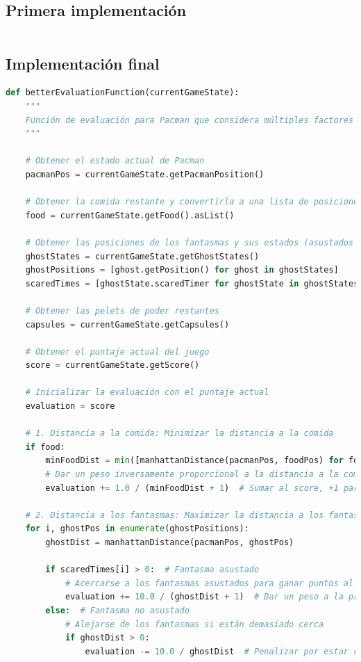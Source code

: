 \documentclass{report}
\begin{document}
        \subsection*{Primera implementación}
          \begin{lstlisting}[language=Python, caption=Implementación inicial de la función de evaluación]
          \end{lstlisting}
        \subsection*{Implementación final}
          \begin{lstlisting}[language=Python, caption=Implementación final de la función de evaluación]
def betterEvaluationFunction(currentGameState):
    """
    Función de evaluación para Pacman que considera múltiples factores del estado de juego.
    """

    # Obtener el estado actual de Pacman
    pacmanPos = currentGameState.getPacmanPosition()
    
    # Obtener la comida restante y convertirla a una lista de posiciones
    food = currentGameState.getFood().asList()
    
    # Obtener las posiciones de los fantasmas y sus estados (asustados o no)
    ghostStates = currentGameState.getGhostStates()
    ghostPositions = [ghost.getPosition() for ghost in ghostStates]
    scaredTimes = [ghostState.scaredTimer for ghostState in ghostStates]
    
    # Obtener las pelets de poder restantes
    capsules = currentGameState.getCapsules()
    
    # Obtener el puntaje actual del juego
    score = currentGameState.getScore()
    
    # Inicializar la evaluación con el puntaje actual
    evaluation = score

    # 1. Distancia a la comida: Minimizar la distancia a la comida
    if food:
        minFoodDist = min([manhattanDistance(pacmanPos, foodPos) for foodPos in food])
        # Dar un peso inversamente proporcional a la distancia a la comida
        evaluation += 1.0 / (minFoodDist + 1)  # Sumar al score, +1 para evitar división por 0

    # 2. Distancia a los fantasmas: Maximizar la distancia a los fantasmas (si no están asustados)
    for i, ghostPos in enumerate(ghostPositions):
        ghostDist = manhattanDistance(pacmanPos, ghostPos)
        
        if scaredTimes[i] > 0:  # Fantasma asustado
            # Acercarse a los fantasmas asustados para ganar puntos al comérselos
            evaluation += 10.0 / (ghostDist + 1)  # Dar un peso a la proximidad a fantasmas asustados
        else:  # Fantasma no asustado
            # Alejarse de los fantasmas si están demasiado cerca
            if ghostDist > 0:
                evaluation -= 10.0 / ghostDist  # Penalizar por estar cerca de un fantasma peligroso


\end{lstlisting}
\end{document}
